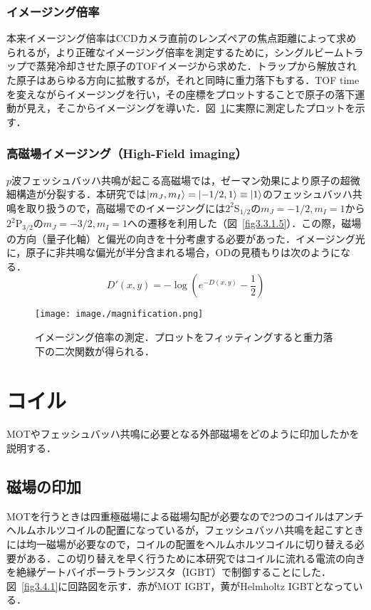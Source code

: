 \documentclass[11pt,a4j,notitlepage]{jreport}
\newcommand{\fig}[1]{図~\ref{#1}}	%
\begin{document}
\subsubsection{イメージング倍率}
本来イメージング倍率はCCDカメラ直前のレンズペアの焦点距離によって求められるが，より正確なイメージング倍率を測定するために，シングルビームトラップで蒸発冷却させた原子のTOFイメージから求めた．トラップから解放された原子はあらゆる方向に拡散するが，それと同時に重力落下もする．TOF timeを変えながらイメージングを行い，その座標をプロットすることで原子の落下運動が見え，そこからイメージングを導いた．\fig{fig3.3.12}に実際に測定したプロットを示す．

\subsubsection{高磁場イメージング（High-Field imaging）}
$p$波フェッシュバッハ共鳴が起こる高磁場では，ゼーマン効果により原子の超微細構造が分裂する．本研究では$\ket{m_J,m_I}=\ket{-1/2,1} \equiv \ket{1}$のフェッシュバッハ共鳴を取り扱うので，高磁場でのイメージングには$2^2$S$_{1/2}$の$m_{J}=-1 / 2, m_{I}=1$から$2^2$P$_{3/2}$の$m_{J}=-3 / 2, m_{I}=1$への遷移を利用した（\fig{fig3.3.1.5}）．この際，磁場の方向（量子化軸）と偏光の向きを十分考慮する必要があった\cite{YoshiJun}．イメージング光に，原子に非共鳴な偏光が半分含まれる場合，ODの見積もりは次のようになる．
\begin{equation}
	D'(x,y) = -\log \left(e^{-D(x,y)}-\frac{1}{2} \right)
	\label{eq3.3.7}
\end{equation}
\begin{figure}[H]
	\centering
		\texttt{[image: image./magnification.png]}
	\caption{イメージング倍率の測定．プロットをフィッティングすると重力落下の二次関数が得られる．}
	\label{fig3.3.12}
\end{figure}

\section{コイル}
MOTやフェッシュバッハ共鳴に必要となる外部磁場をどのように印加したかを説明する．

\subsection{磁場の印加}
MOTを行うときは四重極磁場による磁場勾配が必要なので$2$つのコイルはアンチヘルムホルツコイルの配置になっているが，フェッシュバッハ共鳴を起こすときには均一磁場が必要なので，コイルの配置をヘルムホルツコイルに切り替える必要がある．この切り替えを早く行うために本研究ではコイルに流れる電流の向きを絶縁ゲートバイポーラトランジスタ（IGBT）で制御することにした．\fig{fig3.4.1}に回路図を示す．赤がMOT IGBT，黄がHelmholtz IGBTとなっている．
\end{document}
